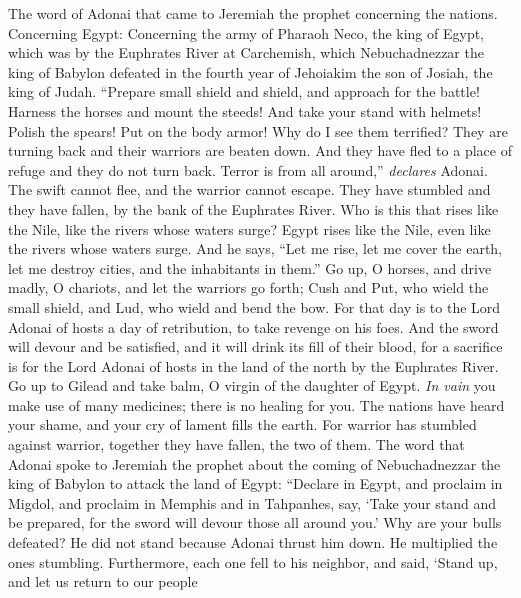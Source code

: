 \begin{biblechapter} %
 The word of Adonai that came to Jeremiah the prophet concerning the nations.
\verse Concerning Egypt: Concerning the army of Pharaoh Neco, the king of Egypt, which was by the Euphrates River at Carchemish, which Nebuchadnezzar the king of Babylon defeated in the fourth year of Jehoiakim the son of Josiah, the king of Judah.
\verse “Prepare small shield and shield, 
and approach for the battle!
\verse Harness the horses and mount the steeds! 
And take your stand with helmets! 
Polish the spears! 
Put on the body armor!
\verse Why do I see them terrified? 
They are turning back 
and their warriors are beaten down. 
And they have fled to a place of refuge 
and they do not turn back. 
Terror is from all around,” \textit{declares} Adonai.
\verse The swift cannot flee, 
and the warrior cannot escape. 
They have stumbled and they have fallen, 
by the bank of the Euphrates River.
\verse Who is this that rises like the Nile, 
like the rivers whose waters surge?
\verse Egypt rises like the Nile, 
even like the rivers whose waters surge. 
And he says, “Let me rise, 
let me cover the earth, 
let me destroy cities, 
and the inhabitants in them.”
\verse Go up, O horses, 
and drive madly, O chariots, 
and let the warriors go forth; 
Cush and Put, who wield the small shield, 
and Lud, who wield and bend the bow.
\verse For that day is to the Lord Adonai of hosts 
a day of retribution, 
to take revenge on his foes. 
And the sword will devour and be satisfied, 
and it will drink its fill of their blood, 
for a sacrifice is for the Lord Adonai of hosts 
in the land of the north by the Euphrates River.
\verse Go up to Gilead and take balm, 
O virgin of the daughter of Egypt. 
\textit{In vain} you make use of many medicines; 
there is no healing for you.
\verse The nations have heard your shame, 
and your cry of lament fills the earth. 
For warrior has stumbled against warrior, 
together they have fallen, the two of them.
\verse The word that Adonai spoke to Jeremiah the prophet about the coming of Nebuchadnezzar the king of Babylon to attack the land of Egypt:
\verse “Declare in Egypt, and proclaim in Migdol, 
and proclaim in Memphis and in Tahpanhes, 
say, ‘Take your stand and be prepared, 
for the sword will devour those all around you.’
\verse Why are your bulls defeated? 
He did not stand because Adonai thrust him down.
\verse He multiplied the ones stumbling. 
Furthermore, each one fell to his neighbor, 
and said, ‘Stand up, and let us return to our people 

\end{biblechapter}
